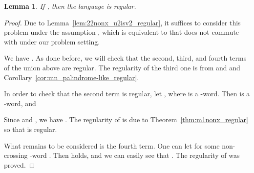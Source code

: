 \documentclass{article}
\theoremstyle{plain}
\newtheorem{lemma}{Lemma}
\theoremstyle{remark}
\begin{document}
\begin{lemma}
	If , then the language  is regular. 
\end{lemma}
\begin{proof}
	Due to Lemma~\ref{lem:22nonx_u2isv2_regular}, it suffices to consider this problem under the assumption , which is equivalent to that  does not commute with  under our problem setting.  

	We have . 
	As done before, we will check that the second, third, and fourth terms of the union above are regular. 
	The regularity of the third one is from  and  and Corollary~\ref{cor:mn_palindrome-like_regular}. 

	In order to check that the second term is regular, let , where  is a -word. 
	Then  is a -word, and 
	
	Since  and , we have . 
	The regularity of  is due to Theorem~\ref{thm:m1nonx_regular} so that  is regular. 

	What remains to be considered is the fourth term. 
	One can let  for some non-crossing -word . 
	Then  holds, and we can easily see that . 
	The regularity of  was proved. 
\end{proof}
\end{document}
